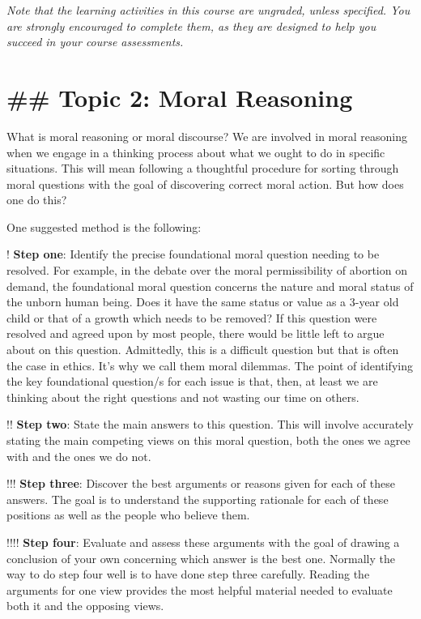 \documentclass[
]{book}
\begin{document}
\emph{Note that the learning activities in this course are ungraded, unless specified. You are strongly encouraged to complete them, as they are designed to help you succeed in your course assessments.}

\hypertarget{topic-2-moral-reasoning}{%
\section{\#\# Topic 2: Moral Reasoning}\label{topic-2-moral-reasoning}}

What is moral reasoning or moral discourse? We are involved in moral reasoning
when we engage in a thinking process about what we ought to do in specific
situations. This will mean following a thoughtful procedure for sorting through
moral questions with the goal of discovering correct moral action. But how does
one do this?

One suggested method is the following:

! \textbf{Step one}: Identify the precise foundational moral question needing to be resolved. For example, in the debate over the moral permissibility of abortion on demand, the foundational moral question concerns the nature and moral status of the unborn human being. Does it have the same status or value as a 3-year old child or that of a growth which needs to be removed? If this question were resolved and agreed upon by most people, there would be little left to argue about on this question. Admittedly, this is a difficult question but that is often the case in ethics. It's why we call them moral dilemmas. The point of identifying the key foundational question/s for each issue is that, then, at least we are thinking about the right questions and not wasting our time on others.

!! \textbf{Step two}: State the main answers to this question. This will involve accurately stating the main competing views on this moral question, both the ones we agree with and the ones we do not.

!!! \textbf{Step three}: Discover the best arguments or reasons given for each of these answers. The goal is to understand the supporting rationale for each of these positions as well as the people who believe them.

!!!! \textbf{Step four}: Evaluate and assess these arguments with the goal of drawing a conclusion of your own concerning which answer is the best one. Normally the way to do step four well is to have done step three carefully. Reading the arguments for one view provides the most helpful material needed to evaluate both it and the opposing views.
\end{document}
